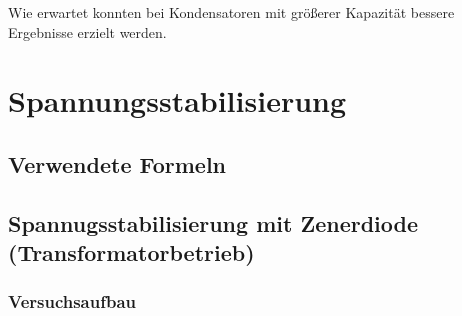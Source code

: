 \documentclass[12pt,a4paper]{article}
\begin{document}
Wie erwartet konnten bei Kondensatoren mit größerer Kapazität bessere Ergebnisse erzielt werden.
\section{Spannungsstabilisierung}
\subsection{Verwendete Formeln}
\subsection{Spannugsstabilisierung mit Zenerdiode (Transformatorbetrieb)}
\subsubsection{Versuchsaufbau}
\end{document}
